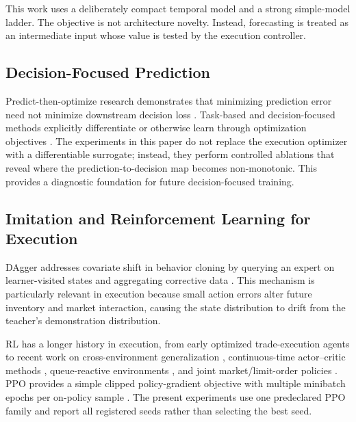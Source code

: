 \documentclass[journal,10pt]{IEEEtran}
\newcommand{\1}{\mathbf{1}}
\begin{document}
This work uses a deliberately compact temporal model and a strong simple-model ladder. The objective is not architecture novelty. Instead, forecasting is treated as an intermediate input whose value is tested by the execution controller.

\subsection{Decision-Focused Prediction}
Predict-then-optimize research demonstrates that minimizing prediction error need not minimize downstream decision loss \cite{ElmachtoubGrigas2022}. Task-based and decision-focused methods explicitly differentiate or otherwise learn through optimization objectives \cite{DontiAmosKolter2017,WilderDilkinaTambe2019}. The experiments in this paper do not replace the execution optimizer with a differentiable surrogate; instead, they perform controlled ablations that reveal where the prediction-to-decision map becomes non-monotonic. This provides a diagnostic foundation for future decision-focused training.

\subsection{Imitation and Reinforcement Learning for Execution}
DAgger addresses covariate shift in behavior cloning by querying an expert on learner-visited states and aggregating corrective data \cite{RossGordonBagnell2011}. This mechanism is particularly relevant in execution because small action errors alter future inventory and market interaction, causing the state distribution to drift from the teacher's demonstration distribution.

RL has a longer history in execution, from early optimized trade-execution agents \cite{NevmyvakaFengKearns2006} to recent work on cross-environment generalization \cite{ZhangDuanChen2023}, continuous-time actor--critic methods \cite{WangGaoLi2026}, queue-reactive environments \cite{EspanaHafsiLilloVittori2025}, and joint market/limit-order policies \cite{CheriditoWeiss2026}. PPO provides a simple clipped policy-gradient objective with multiple minibatch epochs per on-policy sample \cite{SchulmanWolskiDhariwalRadfordKlimov2017}. The present experiments use one predeclared PPO family and report all registered seeds rather than selecting the best seed.
\end{document}
